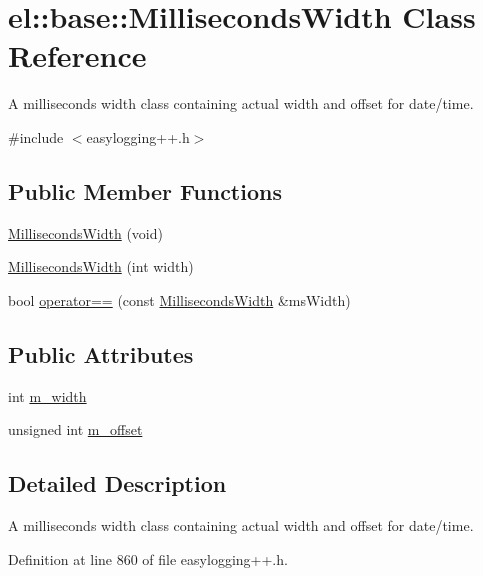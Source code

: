 \hypertarget{classel_1_1base_1_1_milliseconds_width}{}\section{el\+:\+:base\+:\+:Milliseconds\+Width Class Reference}
\label{classel_1_1base_1_1_milliseconds_width}


A milliseconds width class containing actual width and offset for date/time.  




{\ttfamily \#include $<$easylogging++.\+h$>$}

\subsection*{Public Member Functions}
\begin{DoxyCompactItemize}
\item 
\hyperlink{classel_1_1base_1_1_milliseconds_width_a87712d779ce80d6ba4fffb3b7d20d1bd}{Milliseconds\+Width} (void)
\item 
\hyperlink{classel_1_1base_1_1_milliseconds_width_a358fa0fcdd4076c4038ecdfc206de38a}{Milliseconds\+Width} (int width)
\item 
bool \hyperlink{classel_1_1base_1_1_milliseconds_width_a60f5fb6e31216d1268585b98d20517ff}{operator==} (const \hyperlink{classel_1_1base_1_1_milliseconds_width}{Milliseconds\+Width} \&ms\+Width)
\end{DoxyCompactItemize}
\subsection*{Public Attributes}
\begin{DoxyCompactItemize}
\item 
int \hyperlink{classel_1_1base_1_1_milliseconds_width_a31c468b0323d376505c4975720c7b66e}{m\+\_\+width}
\item 
unsigned int \hyperlink{classel_1_1base_1_1_milliseconds_width_a0e98edbecf602a915d4d609747c52669}{m\+\_\+offset}
\end{DoxyCompactItemize}


\subsection{Detailed Description}
A milliseconds width class containing actual width and offset for date/time. 

Definition at line 860 of file easylogging++.\+h.



